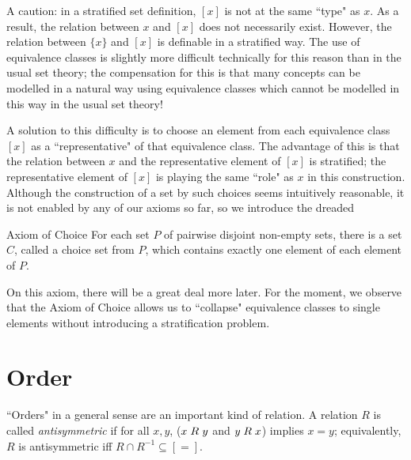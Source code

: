 A caution: in a stratified set
definition, $[x]$ is not at the same ``type" as $x$.
As a result, the relation between $x$ and $[x]$ does not necessarily exist.
However, the relation between $\{x\}$ and $[x]$ is definable in
a stratified way.  The use of equivalence classes is slightly more
difficult technically for this reason than in the usual set
theory;
the compensation for this is that many concepts can be modelled in a
natural way using equivalence classes which cannot be modelled in this
way in the usual set theory!

A solution to this difficulty is to choose an element from each
equivalence class $[x]$ as a ``representative" of that equivalence
class.  The advantage of this is that the relation between $x$ and the
representative element of $[x]$ is stratified; the
representative element of $[x]$ is playing the same ``role" as $x$ in this
construction.  Although the construction of a set by such choices seems intuitively reasonable, it is not enabled by any of our axioms
so far, so we introduce the dreaded

\begin{axiom}{Axiom of Choice}
 For each set $P$ of pairwise disjoint non-empty
 sets, there is a set $C$, called a {\upshape choice set\/} from $P$, which
 contains exactly one element of each element of $P$.
\end{axiom}

On this axiom, there will be a great deal more later.  For the
moment, we observe that the Axiom of Choice allows us to ``collapse"
equivalence classes to single
elements without introducing a stratification problem.




\section{Order}

``Orders" in a general sense are an important kind of relation.  A relation $R$ is called {\itshape
antisymmetric\/} if for all $x,y$, ($x 
\mathrel{R} y$ and $y \mathrel{R} x$) implies $x = y$; equivalently, $R$ is antisymmetric iff
$R \cap R^{-1} \subseteq [=]$.


